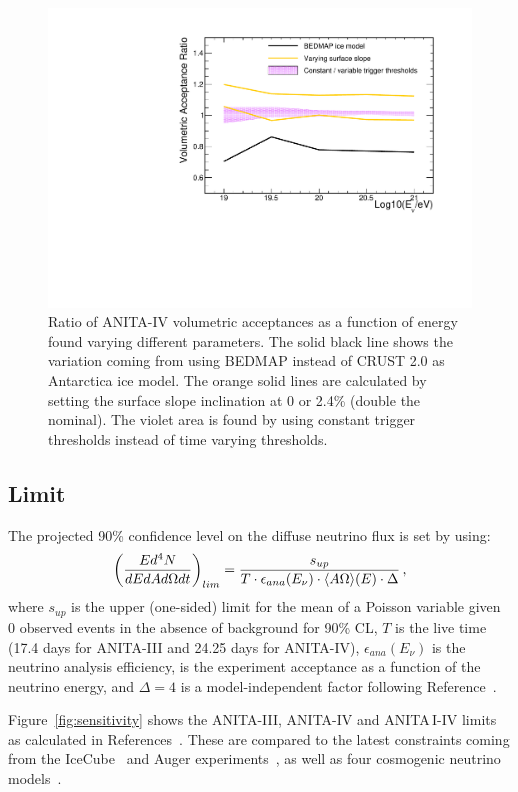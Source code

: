 \begin{figure}[!h]\centering
  \includegraphics[width=.45\linewidth]{./Figs/SystUncertaintiesForPaper.pdf}
  \caption{Ratio of ANITA-IV volumetric acceptances as a function of energy found varying different \icemc parameters. The solid black line shows the variation coming from using BEDMAP instead of CRUST 2.0 as Antarctica ice model.
  The orange solid lines are calculated by setting the surface slope inclination at 0 or 2.4\% (double the nominal).
  The violet area is found by using constant trigger thresholds instead of time varying thresholds. }
  \label{fig:moreAcceptanceVariations}
\end{figure}

\subsection{Limit}
\label{subsec:limit}
The projected 90\% confidence level on the diffuse neutrino flux is set by using:
\begin{equation}
\left( \dfrac{Ed^4N}{dE dA d\Omega dt}\right)_{lim} =
\dfrac{s_{up}}{ T \cdot \epsilon_{ana} (E_\nu) \cdot \langle A\Omega\rangle(E) \cdot \Delta} \, ,
\end{equation}
\noindent
where
$s_{up}$ is the upper (one-sided) limit for the mean of a Poisson
variable given 0 observed events in the absence of background for 90\%
CL, 
$T$ is the live time 
(17.4 days for ANITA-III and 24.25 days for ANITA-IV), 
$\epsilon_{ana}(E_\nu)$ is the neutrino analysis efficiency,
\effarea is the experiment acceptance as a function of the neutrino
energy, and $\Delta=4$ is a model-independent factor following Reference~\cite{PhysRevD.73.082002}.


Figure~\ref{fig:sensitivity} shows the ANITA-III, ANITA-IV and ANITA\,I-IV limits as calculated in References~\cite{anita3cosmogenic,anita4cosmogenic}.
These are compared to the latest constraints coming from the IceCube~\cite{icecube2018} and Auger experiments~\cite{auger2017}, as well as
four cosmogenic neutrino models~\cite{kkss2002,takami2009,ahlers2012,kotera2010cosmogenic}.

